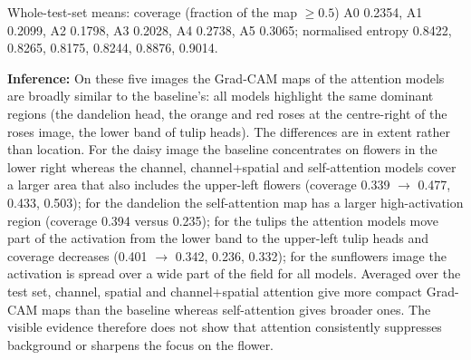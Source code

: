 \documentclass[10pt]{article}
\begin{document}
\begin{center}
\end{center}

Whole-test-set means: coverage (fraction of the map $\ge0.5$) A0 0.2354, A1 0.2099, A2 0.1798, A3 0.2028, A4 0.2738, A5 0.3065; normalised entropy 0.8422, 0.8265, 0.8175, 0.8244, 0.8876, 0.9014.

\textbf{Inference:} On these five images the Grad-CAM maps of the attention models are broadly similar to the baseline's: all models highlight the same dominant regions (the dandelion head, the orange and red roses at the centre-right of the roses image, the lower band of tulip heads).
The differences are in extent rather than location. For the daisy image the baseline concentrates on flowers in the lower right whereas the channel, channel+spatial and self-attention models cover a larger area that also includes the upper-left flowers (coverage 0.339 $\rightarrow$ 0.477, 0.433, 0.503);
for the dandelion the self-attention map has a larger high-activation region (coverage 0.394 versus 0.235); for the tulips the attention models move part of the activation from the lower band to the upper-left tulip heads and coverage decreases (0.401 $\rightarrow$ 0.342, 0.236, 0.332); for the sunflowers
image the activation is spread over a wide part of the field for all models. Averaged over the test set, channel, spatial and channel+spatial attention give more compact Grad-CAM maps than the baseline whereas self-attention gives broader ones.
The visible evidence therefore does not show that attention consistently suppresses background or sharpens the focus on the flower.
\end{document}

